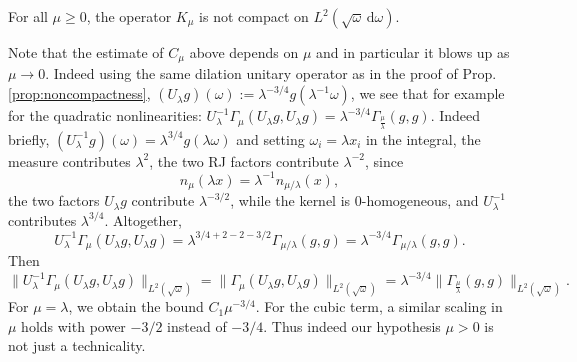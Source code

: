\documentclass[10pt,a4paper]{amsart}
\newcommand{\dd}{{\, \mathrm d}}
\begin{document}
\begin{proposition} \label{prop:noncompactness}
  For all $\mu  \geq 0$, the operator $K_\mu$ is not compact on $L^2(\sqrt{\omega} \dd \omega)$.
\end{proposition}

\begin{remark}
Note that the estimate of $C_\mu $ above depends on $\mu$ and in particular it blows up as $\mu \to 0$. Indeed using the same dilation unitary operator as in the proof of Prop. \ref{prop:noncompactness}, $(U_\lambda g)(\omega) := \lambda^{-3/4} g(\lambda^{-1}\omega)$, we see that for example for the quadratic nonlinearities: $U_\lambda^{-1} \Gamma_{\mu} (U_\lambda g,U_\lambda g) = \lambda^{-3/4}\Gamma_{\tfrac{\mu}{\lambda}} (g,g) $. Indeed briefly, $(U_\lambda^{-1}g)(\omega)=\lambda^{3/4}g(\lambda\omega)$ and setting $ \omega_i=\lambda x_i$ in the integral, the measure contributes $\lambda^2$, the two RJ  factors contribute $\lambda^{-2}$, since $$ n_\mu(\lambda x)=\lambda^{-1}n_{\mu/\lambda}(x),  $$ the two factors $U_\lambda g$ contribute $\lambda^{-3/2}$, while the kernel is 0-homogeneous, and $U_\lambda^{-1}$ contributes $\lambda^{3/4}$. Altogether, $$ U_\lambda^{-1}\Gamma_\mu(U_\lambda g,U_\lambda g) = \lambda^{3/4+2-2-3/2} \Gamma_{\mu/\lambda}(g,g) = \lambda^{-3/4}\Gamma_{\mu/\lambda}(g,g). $$
Then $$\| U_\lambda^{-1} \Gamma_{\mu} (U_\lambda g,U_\lambda g)\|_{L^2(\sqrt{\omega})} = \| \Gamma_{\mu} (U_\lambda g,U_\lambda g) \|_{L^2(\sqrt{\omega})}  = \lambda^{-3/4} \|\Gamma_{\tfrac{\mu}{\lambda}} ( g,g) \|_{L^2(\sqrt{\omega})}. $$
For $\mu=\lambda$, we obtain the bound $C_1\mu^{-3/4}$. For the cubic term, a similar scaling in $\mu$ holds with power $-3/2$ instead of $-3/4$. Thus indeed our hypothesis $\mu>0$ is not just a technicality. 
\end{remark}
\end{document}
